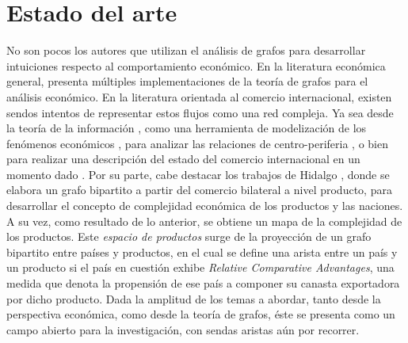\documentclass[runningheads,a4paper]{llncs}
\begin{document}
\section{Estado del arte}

No son pocos los autores que utilizan el análisis de grafos para desarrollar intuiciones respecto al comportamiento económico. En la literatura económica general, \citet{Jackson2008} presenta múltiples implementaciones de la teoría de grafos para el análisis económico. 
En la literatura orientada al comercio internacional, existen sendos intentos de representar estos flujos como una red compleja. Ya sea desde la teoría de la información \citep{Bhattacharya2008},  como una herramienta de modelización de los fenómenos económicos \citep{Fan2014}, para analizar las relaciones de centro-periferia \citep{Fagiolo2010}, o bien para realizar una descripción del estado del comercio internacional en un momento dado \citep{Chow2013}.
Por su parte, cabe destacar los trabajos de Hidalgo \citep{Hidalgo2007,Hidalgo2009a, Hidalgo2009}, donde se elabora un grafo bipartito a partir del comercio bilateral a nivel producto, para desarrollar el concepto de complejidad económica de los productos y las naciones. A su vez, como resultado de lo anterior, se obtiene un mapa de la complejidad de los productos. Este \textit{espacio de productos} surge de la proyección de un grafo bipartito entre países y productos, en el cual se define una arista entre un país y un producto si el país en cuestión exhibe \textit{Relative Comparative Advantages}, una medida que denota la propensión de ese país a componer su canasta exportadora por dicho producto. Dada la amplitud de los temas a abordar, tanto desde la perspectiva económica, como desde la teoría de grafos, éste se presenta como un campo abierto para la investigación, con sendas aristas aún por recorrer.  
\end{document}
